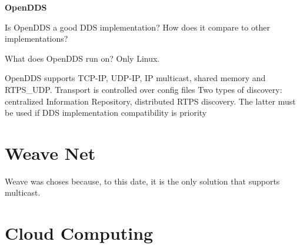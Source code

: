 \textbf{OpenDDS}

Is OpenDDS a good DDS implementation? How does it compare to other implementations?

What does OpenDDS run on? Only Linux.

OpenDDS supports TCP-IP, UDP-IP, IP multicast, shared memory and RTPS\_UDP. Transport is controlled over config files
Two types of discovery: centralized Information Repository, distributed RTPS discovery. The latter must be used if DDS implementation compatibility is priority


\section{Weave Net}

Weave was choses because, to this date, it is the only solution that supports multicast.


\section{Cloud Computing}



